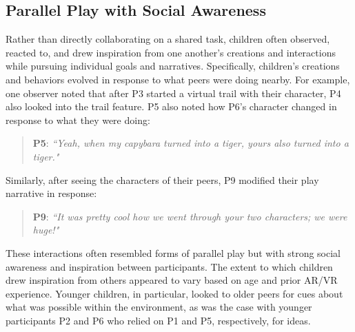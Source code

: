 \documentclass[sigconf,nonacm]{acmart}
\begin{document}

\subsection{Parallel Play with Social Awareness}
Rather than directly collaborating on a shared task, children often observed, reacted to, and drew inspiration from one another’s creations and interactions while pursuing individual goals and narratives. Specifically, children’s creations and behaviors evolved in response to what peers were doing nearby. For example, one observer noted that after P3 started a virtual trail with their character, P4 also looked into the trail feature. P5 also noted how P6’s character changed in response to what they were doing: 
\begin{quote}
    \textbf{P5}: \textit{``Yeah, when my capybara turned into a tiger, yours also turned into a tiger."}
\end{quote}

\noindent Similarly, after seeing the characters of their peers, P9 modified their play narrative in response:
\begin{quote}
    \textbf{P9}: \textit{``It was pretty cool how we went through your two characters; we were huge!"}
\end{quote}

These interactions often resembled forms of parallel play but with strong social awareness and inspiration between participants. The extent to which children drew inspiration from others appeared to vary based on age and prior AR/VR experience. Younger children, in particular, looked to older peers for cues about what was possible within the environment, as was the case with younger participants P2 and P6 who relied on P1 and P5, respectively, for ideas.
\end{document}
